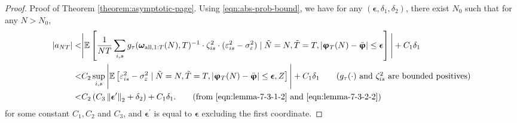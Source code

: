 \begin{proof}{Proof of Theorem \ref{theorem:asymptotic-page}.}
Using \eqref{eqn:abs-prob-bound}, we have for any $(\bm\epsilon, \delta_1, \delta_2)$, there exist $N_0$ such that for any $N > N_0$,
\begin{align*}
    |a_{NT}| <& \Bigg|\+E \left[ \frac{1}{NT} \sum_{i,s} \funfrac(\bm{\omega}_{\all,1:T}(N),T)^\I \cdot   \zeta_{is}^2  \cdot (\varepsilon_{is}^2 - \sigma_\varepsilon^2) \mid \tilde{N} = N, \tilde{T} = T, |\bm{\upvarphi}_T(N) - \bar{\bm{\upvarphi}}|  \leq  \bm\epsilon \right]\Bigg|  + C_1 \delta_1 \\
    <& C_2 \sup_{i,s} \Bigg|\+E \left[ \varepsilon_{is}^2 - \sigma_\varepsilon^2 \mid \tilde{N} = N, \tilde{T} = T, |\bm{\upvarphi}_T(N) - \bar{\bm{\upvarphi}}|  \leq  \bm\epsilon, Z \right]\Bigg|  + C_1 \delta_1 \tag{$g_\tau(\cdot)$ and $\zeta_{is}^2$ are bounded positives} \\
    <& C_2 \left(C_3 \norm{{\bm{\epsilon}}^\prime}_2  + \delta_2\right) + C_1 \delta_1. \tag{from \eqref{eqn:lemma-7-3-1-2} and \eqref{eqn:lemma-7-3-2-2}}
\end{align*}
for some constant $C_1, C_2$ and $C_3$, and ${\bm{\epsilon}}^\prime$ is equal to ${\bm{\epsilon}}$ excluding the first coordinate. 


\end{proof}
